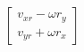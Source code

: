 \documentclass[preview]{standalone}
\begin{document}
\begin{align*}
\begin{bmatrix} v_{xr}-\omega r_y \\ v_{yr}+\omega r_x \end{bmatrix}
\end{align*}
\end{document}
